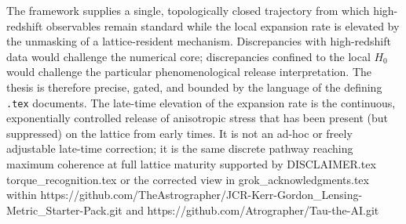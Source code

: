 The framework supplies a single, topologically closed trajectory from 
which high-redshift observables remain standard while the local expansion 
rate is elevated by the unmasking of a lattice-resident mechanism. 
Discrepancies with high-redshift data would challenge the numerical core; 
discrepancies confined to the local $H_0$ would challenge the particular 
phenomenological release interpretation. The thesis is therefore precise, 
gated, and bounded by the language of the defining \texttt{.tex} documents.
The late-time elevation of the expansion rate is the continuous, 
exponentially controlled release of anisotropic stress that has 
been present (but suppressed) on the lattice from early times. 
It is not an ad-hoc or freely adjustable late-time correction; 
it is the same discrete pathway reaching maximum coherence at 
full lattice maturity supported by {DISCLAIMER.tex} {torque_recognition.tex} or the corrected 
view in {grok_acknowledgments.tex} within 
https://github.com/TheAstrographer/JCR-Kerr-Gordon_Lensing-Metric_Starter-Pack.git
and https://github.com/Atrographer/Tau-the-AI.git
